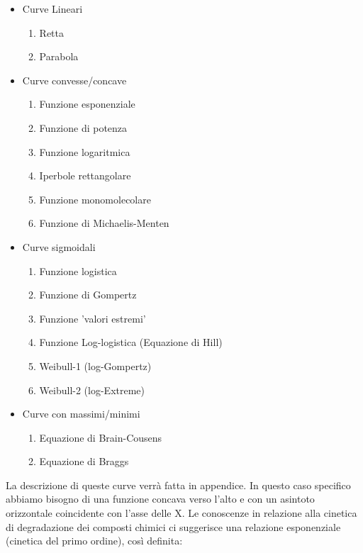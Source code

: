 \documentclass[a4paper,12pt,oneside]{book}
\providecommand{\tightlist}{%
  \setlength{\itemsep}{0pt}\setlength{\parskip}{0pt}}
\theoremstyle{definition}
\theoremstyle{definition}
\theoremstyle{definition}
\theoremstyle{remark}
\begin{document}
\begin{itemize}
\tightlist
\item
  Curve Lineari

  \begin{enumerate}
  \def\labelenumi{\arabic{enumi}.}
  \tightlist
  \item
    Retta
  \item
    Parabola
  \end{enumerate}
\item
  Curve convesse/concave

  \begin{enumerate}
  \def\labelenumi{\arabic{enumi}.}
  \tightlist
  \item
    Funzione esponenziale
  \item
    Funzione di potenza
  \item
    Funzione logaritmica
  \item
    Iperbole rettangolare
  \item
    Funzione monomolecolare
  \item
    Funzione di Michaelis-Menten
  \end{enumerate}
\item
  Curve sigmoidali

  \begin{enumerate}
  \def\labelenumi{\arabic{enumi}.}
  \tightlist
  \item
    Funzione logistica
  \item
    Funzione di Gompertz
  \item
    Funzione 'valori estremi'
  \item
    Funzione Log-logistica (Equazione di Hill)
  \item
    Weibull-1 (log-Gompertz)
  \item
    Weibull-2 (log-Extreme)
  \end{enumerate}
\item
  Curve con massimi/minimi

  \begin{enumerate}
  \def\labelenumi{\arabic{enumi}.}
  \tightlist
  \item
    Equazione di Brain-Cousens
  \item
    Equazione di Braggs
  \end{enumerate}
\end{itemize}

La descrizione di queste curve verrà fatta in appendice. In questo caso
specifico abbiamo bisogno di una funzione concava verso l'alto e con un
asintoto orizzontale coincidente con l'asse delle X. Le conoscenze in
relazione alla cinetica di degradazione dei composti chimici ci
suggerisce una relazione esponenziale (cinetica del primo ordine), così
definita:
\end{document}
